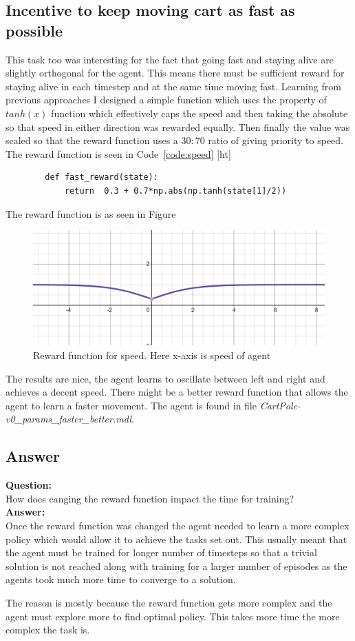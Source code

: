 \documentclass[a4paper]{article}
\newenvironment{code}{\captionsetup{type=listing}}{}
\begin{document}
\subsection{Incentive to keep moving cart as fast as possible}
This task too was interesting for the fact that going fast and staying alive are slightly orthogonal for the agent. This means there must be sufficient reward for staying alive in each timestep and at the same time moving fast. Learning from previous approaches I designed a simple function which uses the property of $tanh(x)$ function which effectively caps the speed and then taking the absolute so that speed in either direction was rewarded equally. Then finally the value was scaled so that the reward function uses a  $30:70$ ratio of giving priority to speed. The reward function is seen in Code~\ref{code:speed}
\begin{code}[ht]
    \label{code:speed}
    \begin{verbatim}
        def fast_reward(state):
            return  0.3 + 0.7*np.abs(np.tanh(state[1]/2)) 
    \end{verbatim}
\end{code}
The reward function is as seen in Figure~
\begin{figure}[ht!]
    \centering
    \includegraphics[width=\textwidth]{speed.PNG}
    \caption{Reward function for speed. Here x-axis is speed of agent}
    \label{fig:speed}
\end{figure}
The results are nice, the agent learns to oscillate between left and right and achieves a decent speed. There might be a better reward function that allows the agent to learn a faster movement. The agent is found in file \textit{CartPole-v0\_params\_faster\_better.mdl}.

\subsection{Answer}
\textbf{Question:}\\
How does canging the reward function impact the time for training?
\\
\textbf{Answer:}\\
Once the reward function was changed the agent needed to learn a more complex policy which would allow it to achieve the tasks set out. This usually meant that the agent must be trained for longer number of timesteps so that a trivial solution is not reached along with training for a larger number of episodes as the agents took much more time to converge to a solution.

The reason is mostly because the reward function gets more complex and the agent must explore more to find optimal policy. This takes more time the more complex the task is. 
\end{document}
